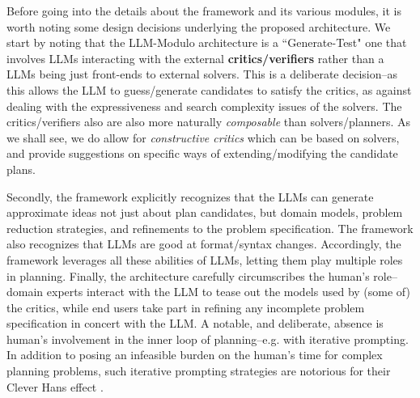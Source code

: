 \documentclass{article}
\newcommand{\bnote}[1]{\color{black}#1\color{black}}
\newcommand{\rao}[1]{\noindent\textcolor{red}{#1}}
\theoremstyle{plain}
\theoremstyle{definition}
\theoremstyle{remark}
\begin{document}


%


 Before going into the details about the framework and its various modules, it is worth noting some design decisions underlying the proposed architecture. We start by noting that the LLM-Modulo architecture is a ``Generate-Test" one that involves LLMs interacting with the external \textbf{critics/verifiers} rather than a LLMs being just front-ends to external solvers. This is a deliberate decision--as this allows the LLM to guess/generate candidates to satisfy the critics, as against dealing with the expressiveness and search complexity issues of the solvers. \bnote{The critics/verifiers also are also more naturally {\em composable} than solvers/planners. As we shall see, we do allow for {\em constructive critics} which can be based on solvers, and provide suggestions on specific ways of extending/modifying the candidate plans.}
%

Secondly, the framework explicitly recognizes that the LLMs can generate approximate ideas not just about plan candidates, but domain models, problem reduction strategies, and refinements to the problem specification. The framework also recognizes that LLMs are good at format/syntax changes. Accordingly, the framework leverages all these abilities of LLMs, letting them play multiple roles in planning. 
%
Finally, the architecture carefully circumscribes the human's role--domain experts interact with the LLM to tease out the models used by (some of) the critics, while end users take part in refining any incomplete problem specification in concert with the LLM. A notable, and deliberate, absence is human's involvement in the inner loop of planning--e.g. with iterative prompting. 
In addition to posing an infeasible burden on the human's time for complex planning problems, such iterative prompting strategies are notorious for their Clever Hans effect \cite{cleverhans-wikipedia}.
%

%
\end{document}
